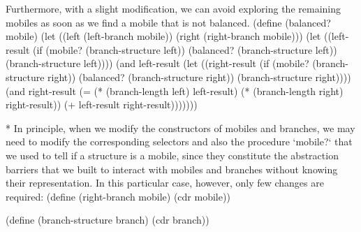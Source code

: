 Furthermore, with a slight modification, we can avoid exploring the remaining mobiles as soon as we find a mobile that is not balanced.
\begtt\scm
(define (balanced? mobile)
  (let ((left (left-branch mobile))
        (right (right-branch mobile)))
    (let ((left-result (if (mobile? (branch-structure left))
                           (balanced? (branch-structure left))
                           (branch-structure left))))
      (and left-result
           (let ((right-result (if (mobile? (branch-structure right))
                                   (balanced? (branch-structure right))
                                   (branch-structure right))))
              (and right-result
                   (= (* (branch-length left) left-result)
                      (* (branch-length right) right-result))
                   (+ left-result right-result)))))))
\endtt

* In principle, when we modify the constructors of mobiles and branches, we may need to modify the corresponding selectors and also the procedure `mobile?` that we used to tell if a structure is a mobile, since they constitute the abstraction barriers that we built to interact with mobiles and branches without knowing their representation. In this particular case, however, only few changes are required:
\begtt\scm
(define (right-branch mobile)
  (cdr mobile))

(define (branch-structure branch)
  (cdr branch))
\endtt
\enditems
